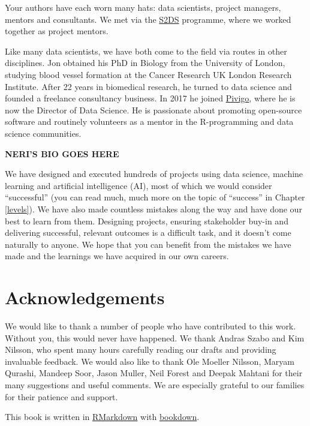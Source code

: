 \documentclass[
]{book}
\begin{document}
Your authors have each worn many hats: data scientists, project managers, mentors and consultants. We met via the \href{http://www.s2ds.org/}{S2DS} programme, where we worked together as project mentors.

Like many data scientists, we have both come to the field via routes in other disciplines. Jon obtained his PhD in Biology from the University of London, studying blood vessel formation at the Cancer Research UK London Research Institute. After 22 years in biomedical research, he turned to data science and founded a freelance consultancy business. In 2017 he joined \href{https://www.pivigo.com}{Pivigo}, where he is now the Director of Data Science. He is passionate about promoting open-source software and routinely volunteers as a mentor in the R-programming and data science communities.

\textbf{NERI'S BIO GOES HERE}

We have designed and executed hundreds of projects using data science, machine learning and artificial intelligence (AI), most of which we would consider ``successful'' (you can read much, much more on the topic of ``success'' in Chapter \ref{levels}). We have also made countless mistakes along the way and have done our best to learn from them. Designing projects, ensuring stakeholder buy-in and delivering successful, relevant outcomes is a difficult task, and it doesn't come naturally to anyone. We hope that you can benefit from the mistakes we have made and the learnings we have acquired in our own careers.

\hypertarget{acknowledgements}{%
\section*{Acknowledgements}\label{acknowledgements}}

We would like to thank a number of people who have contributed to this work. Without you, this would never have happened. We thank Andras Szabo and Kim Nilsson, who spent many hours carefully reading our drafts and providing invaluable feedback. We would also like to thank Ole Moeller Nilsson, Maryam Qurashi, Mandeep Soor, Jason Muller, Neil Forest and Deepak Mahtani for their many suggestions and useful comments. We are especially grateful to our families for their patience and support.

This book is written in \href{https://rmarkdown.rstudio.com/}{RMarkdown} with \href{https://bookdown.org/}{bookdown}.
\end{document}
